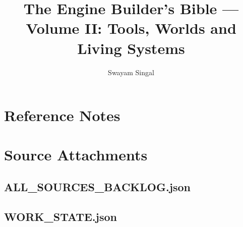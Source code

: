 \documentclass[11pt,twoside]{book}
\title{The Engine Builder's Bible --- Volume II: Tools, Worlds and Living Systems}
\author{Swayam Singal}
\begin{document}
\maketitle
\hypertarget{volume-reading-map}{}
\tableofcontents
\mainmatter























\appendix
\chapter{Reference Notes}











\chapter{Source Attachments}
\hypertarget{source-file-77f5d6d48d2587f7e7779921}{}
\section*{ALL\_SOURCES\_BACKLOG.json}
\hypertarget{source-file-4269beda3a2effefff717ba5}{}
\section*{WORK\_STATE.json}
\hypertarget{source-file-02ebf2c2c2c38aae0035fc9f}{}
\end{document}
